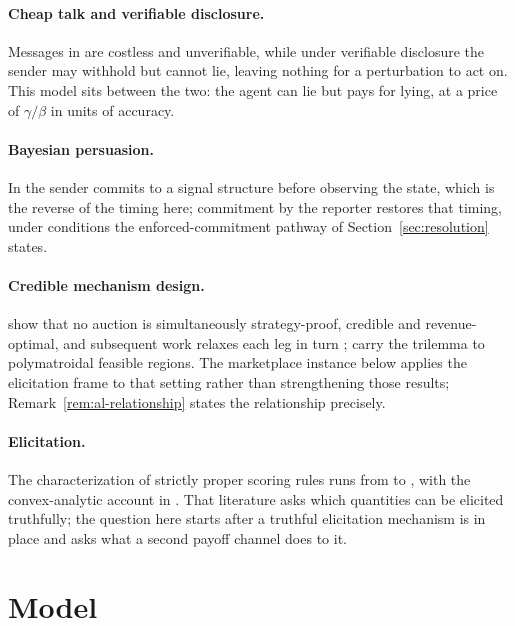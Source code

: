 \documentclass[acmsmall,nonacm,screen]{acmart}
\theoremstyle{acmplain}%
\theoremstyle{acmdefinition}%
\numberwithin{equation}{section}
\begin{document}
\paragraph{Cheap talk and verifiable disclosure.} Messages in \citet{crawford1982strategic} are costless and unverifiable, while under verifiable disclosure \citep{grossman1981informational,milgrom1981good,dye1985disclosure} the sender may withhold but cannot lie, leaving nothing for a perturbation to act on. This model sits between the two: the agent can lie but pays for lying, at a price of $\gamma/\beta$ in units of accuracy.

\paragraph{Bayesian persuasion.} In \citet{gentzkow2011bayesian} the sender commits to a signal structure before observing the state, which is the reverse of the timing here; commitment by the reporter restores that timing, under conditions the enforced-commitment pathway of Section~\ref{sec:resolution} states.

\paragraph{Credible mechanism design.} \citet{akbarpour2020credible} show that no auction is simultaneously strategy-proof, credible and revenue-optimal, and subsequent work relaxes each leg in turn \citep{ferreira2020credibility,li2017obviously,dworczak2020mechanism}; \citet{loven2026trilemma} carry the trilemma to polymatroidal feasible regions. The marketplace instance below applies the elicitation frame to that setting rather than strengthening those results; Remark~\ref{rem:al-relationship} states the relationship precisely.

\paragraph{Elicitation.} The characterization of strictly proper scoring rules runs from \citet{savage1971elicitation} to \citet{gneiting2007strictly}, with the convex-analytic account in \citet{schervish1989general}. That literature asks which quantities can be elicited truthfully; the question here starts after a truthful elicitation mechanism is in place and asks what a second payoff channel does to it.

\section{Model}\label{sec:model}
\end{document}
